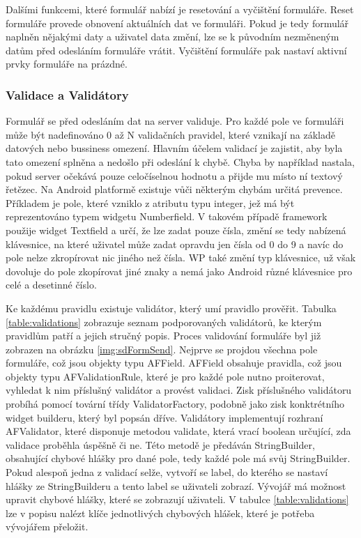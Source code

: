 Dalšími funkcemi, které formulář nabízí je resetování a vyčištění formuláře. Reset formuláře provede obnovení aktuálních dat ve formuláři. Pokud je tedy formulář naplněn nějakými daty a uživatel data změní, lze se k původním nezměneným datům před odesláním formuláře vrátit. Vyčištění formuláře pak nastaví aktivní prvky formuláře na prázdné.

\subsubsection{Validace a Validátory}
Formulář se před odesláním dat na server validuje. Pro každé pole ve formuláři může být nadefinováno 0 až N validačních pravidel, které vznikají na základě datových nebo bussiness omezení. Hlavním účelem validací je zajistit, aby byla tato omezení splněna a nedošlo při odeslání k chybě. Chyba by například nastala, pokud server očekává pouze celočíselnou hodnotu a přijde mu místo ní textový řetězec. Na Android platformě existuje vůči některým chybám určitá prevence. Příkladem je pole, které vzniklo z atributu typu integer, jež má být reprezentováno typem widgetu Numberfield. V takovém případě framework použije widget Textfield a určí, že lze zadat pouze čísla, změní se tedy nabízená klávesnice, na které uživatel může zadat opravdu jen čísla od 0 do 9 a navíc do pole nelze zkropírovat nic jiného než čísla. WP také změní typ klávesnice, už však dovoluje do pole zkopírovat jiné znaky a nemá jako Android různé klávesnice pro celé a desetinné číslo.

Ke každému pravidlu existuje validátor, který umí pravidlo prověřit. Tabulka \ref{table:validations} zobrazuje seznam podporovaných validátorů, ke kterým pravidlům patří a jejich stručný popis. Proces validování formuláře byl již zobrazen na obrázku \ref{img:sdFormSend}. Nejprve se projdou všechna pole formuláře, což jsou objekty typu AFField. AFField obsahuje pravidla, což jsou objekty typu AFValidationRule, které je pro každé pole nutno proiterovat, vyhledat k nim příslušný validátor a provést validaci. Zisk příslušného validátoru probíhá pomocí tovární třídy ValidatorFactory, podobně jako zisk konktrétního widget builderu, který byl popsán dříve. Validátory implementují rozhraní AFValidator, které disponuje metodou validate, která vrací boolean určující, zda validace proběhla úspěšně či ne. Této metodě je předáván StringBuilder, obsahující chybové hlášky pro dané pole, tedy každé pole má svůj StringBuilder. Pokud alespoň jedna z validací selže, vytvoří se label, do kterého se nastaví hlášky ze StringBuilderu a tento label se uživateli zobrazí. Vývojář má možnost upravit chybové hlášky, které se zobrazují uživateli. V tabulce \ref{table:validations} lze v popisu nalézt klíče jednotlivých chybových hlášek, které je potřeba vývojářem přeložit.

